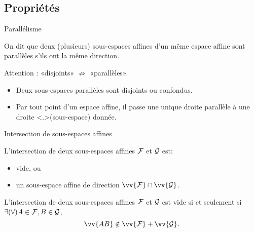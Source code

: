 \documentclass[
bigger]{m53beamer}
\begin{document}
\subsection{Propriétés}
  \begin{frame}{Parallélisme}
    \begin{definition}
      On dit que deux (plusieurs) sous-espaces affines d'un même espace affine sont
      \alert{parallèles} s'ils ont la même direction.\pause{}
    \end{definition}\pause
    Attention : «disjoints» $\not\Rightarrow$ «parallèles».\pause
    \begin{proposition}
      \begin{itemize}[<+->]
        \item Deux sous-espaces parallèles sont disjoints ou confondus.
        \item Par tout point d'un espace affine, il passe une unique droite \uncover<+>{(sous-espace)} parallèle à une droite  donnée.
      \end{itemize}
    \end{proposition}
  \end{frame}
  \begin{frame}{Intersection de sous-espaces affines}
    \begin{proposition}
      L'intersection de deux sous-espaces affines $\mathcal{F}$ et $\mathcal{G}$ est:
      \begin{itemize}\pause
          \item vide\pause, ou
          \item un sous-espace affine de direction $\vv{\ens{F}}\cap\vv{\ens{G}}$.
        \end{itemize}
    \end{proposition}\pause
    \begin{proposition}
      L'intersection de deux sous-espaces affines $\mathcal{F}$ et $\mathcal{G}$ est vide si et seulement si $\exists(\forall) A \in \mathcal{F}, B \in \mathcal{G}$,
      $$
        \vv{AB} \notin \vv{\ens{F}}+\vv{\ens{G}}.
      $$
    \end{proposition}
  \end{frame}
\end{document}
